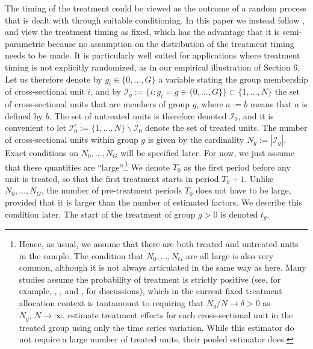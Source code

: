 \documentclass[12pt,fleqn]{article}
\begin{document}
  The timing of the treatment could be viewed as the outcome of a random process that is dealt with through suitable conditioning. In this paper we instead follow \citet{borusyak2021revisiting}, and view the treatment timing as fixed, which has the advantage that it is semi-parametric because no assumption on the distribution of the treatment timing needs to be made. It is particularly well suited for applications where treatment timing is not explicitly randomized, as in our empirical illustration of Section 6. Let us therefore denote by $g_i \in\{ 0,...,G \}$ a variable stating the group membership of cross-sectional unit $i$, and by $\mathcal{I}_g := \{i: g_i = g \in\{ 0,...,G \}\} \subset \{1,...,N\}$ the set of cross-sectional units that are members of group $g$, where $a:=b$ means that $a$ is defined by $b$. The set of untreated units is therefore denoted $\mathcal{I}_0$, and it is convenient to let $\mathcal{I}_0^c := \{1,...,N\}\backslash \mathcal{I}_0$ denote the set of treated units. The number of cross-sectional units within group $g$ is given by the cardinality $N_g := |\mathcal{I}_g|$. Exact conditions on $N_0,...,N_G$ will be specified later. For now, we just assume that these quantities are ``large''.\footnote{Hence, as usual, we assume that there are both treated and untreated units in the sample. The condition that $N_0,...,N_G$ are all large is also very common, although it is not always articulated in the same way as here. Many studies assume the probability of treatment is strictly positive (see, for example, \citealp{Abadie_2005}, \citealp{Callaway_SantAnna_2020}, and \citealp{SantAnna_Zhao2020}, for discussions), which in the current fixed treatment allocation context is tantamount to requiring that $N_g/N \to \delta >0$ as $N_g,\,N \to \infty$. \citet{chan2022pcdid} estimate treatment effects for each cross-sectional unit in the treated group using only the time series variation. While this estimator do not require a large number of treated units, their pooled estimator does.} We denote $T_{0}$ as the first period before any unit is treated, so that the first treatment starts in period $T_0+1$. Unlike $N_0,...,N_G$, the number of pre-treatment periods $T_{0}$ does not have to be large, provided that it is larger than the number of estimated factors. We describe this condition later. The start of the treatment of group $g > 0$ is denoted $t_g$.
  
\end{document}
